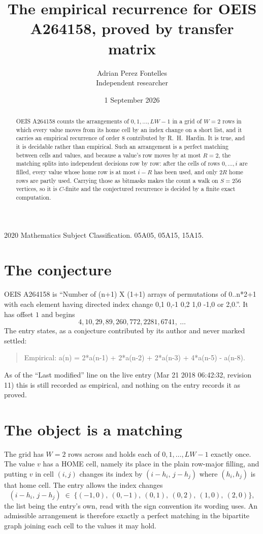 \documentclass[11pt,a4paper]{article}
\title{The empirical recurrence for OEIS A264158, proved by transfer matrix}
\author{Adrian Perez Fontelles\\ \small Independent researcher}
\date{1 September 2026}
\theoremstyle{plain}
\theoremstyle{definition}
\begin{document}
\maketitle

\begin{abstract}
OEIS A264158 counts the arrangements of $0,1,\dots,LW-1$ in a grid of $W=2$ rows in which
every value moves from its home cell by an index change on a short list, and it carries an
empirical recurrence of order $8$ contributed by R.~H.~Hardin. It is true, and it is
decidable rather than empirical. Such an arrangement is a perfect matching between cells and
values, and because a value's row moves by at most $R=2$, the matching splits into
independent decisions row by row: after the cells of rows $0,\dots,i$ are filled,
every value whose home row is at most $i-R$ has been used, and only $2R$ home rows are
partly used. Carrying those as bitmasks makes the count a walk on $S=256$ vertices, so it is
$C$-finite and the conjectured recurrence is decided by a finite exact computation.
\end{abstract}

\noindent\small 2020 Mathematics Subject Classification. 05A05, 05A15, 15A15.\normalsize

\section{The conjecture}

OEIS A264158 is ``Number of (n+1) X (1+1) arrays of permutations of 0..n*2+1 with each element having directed index change 0,1 0,-1 0,2 1,0 -1,0 or 2,0.''. It has offset $1$ and begins
\[
4, 10, 29, 89, 260, 772, 2281, 6741,\ \dots
\]
The entry states, as a conjecture contributed by its author and never marked settled:
\begin{quote}
Empirical: a(n) = 2*a(n-1) + 2*a(n-2) + 2*a(n-3) + 4*a(n-5) - a(n-8).
\end{quote}
As of the ``Last modified'' line on the live entry (Mar 21 2018 06:42:32, revision 11) this is still
recorded as empirical, and nothing on the entry records it as proved.

\section{The object is a matching}

The grid has $W=2$ rows across and holds each of $0,1,\dots,LW-1$ exactly once. The value
$v$ has a HOME cell, namely its place in the plain row-major filling, and putting $v$ in cell
$(i,j)$ changes its index by $(i-h_i,\,j-h_j)$ where $(h_i,h_j)$ is that home cell. The entry
allows the index changes
\[
(i-h_i,\,j-h_j)\;\in\;\{(-1,0),\ (0,-1),\ (0,1),\ (0,2),\ (1,0),\ (2,0)\},
\]
the list being the entry's own, read with the sign convention its wording uses. An admissible
arrangement is therefore exactly a perfect matching in the bipartite graph joining each cell to
the values it may hold.
\end{document}
